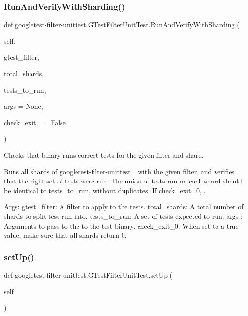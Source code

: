\subsubsection{\texorpdfstring{RunAndVerifyWithSharding()}{RunAndVerifyWithSharding()}}
{\footnotesize\ttfamily def googletest-\/filter-\/unittest.\+G\+Test\+Filter\+Unit\+Test.\+Run\+And\+Verify\+With\+Sharding (\begin{DoxyParamCaption}\item[{}]{self,  }\item[{}]{gtest\+\_\+filter,  }\item[{}]{total\+\_\+shards,  }\item[{}]{tests\+\_\+to\+\_\+run,  }\item[{}]{args = {\ttfamily None},  }\item[{}]{check\+\_\+exit\+\_ = {\ttfamily False} }\end{DoxyParamCaption})}

\begin{DoxyVerb}Checks that binary runs correct tests for the given filter and shard.

Runs all shards of googletest-filter-unittest_ with the given filter, and
verifies that the right set of tests were run. The union of tests run
on each shard should be identical to tests_to_run, without duplicates.
If check_exit_0, .

Args:
  gtest_filter: A filter to apply to the tests.
  total_shards: A total number of shards to split test run into.
  tests_to_run: A set of tests expected to run.
  args   :      Arguments to pass to the to the test binary.
  check_exit_0: When set to a true value, make sure that all shards
            return 0.
\end{DoxyVerb}
 \mbox{\label{classgoogletest-filter-unittest_1_1GTestFilterUnitTest_a5aedf9d24243167acee87c9ddba82cc7}} 
\subsubsection{\texorpdfstring{setUp()}{setUp()}}
{\footnotesize\ttfamily def googletest-\/filter-\/unittest.\+G\+Test\+Filter\+Unit\+Test.\+set\+Up (\begin{DoxyParamCaption}\item[{}]{self }\end{DoxyParamCaption})}

